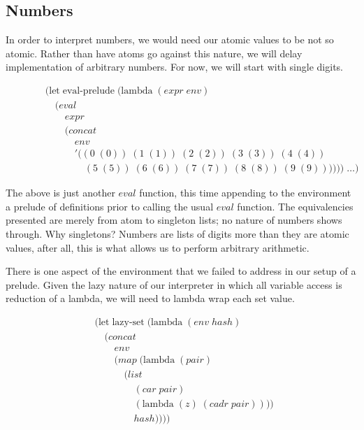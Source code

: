 \subsection{Numbers}
In order to interpret numbers, we would need our atomic values to be not so 
atomic. Rather than have atoms go against this nature, we will delay 
implementation of arbitrary numbers. For now, we will start with single 
digits.

\begin{figure}[ht]
\caption{}\label{scheme}
\begin{align*}
& (\text{let} \; \text{eval-prelude} \; (\text{lambda} \; (expr \; env)
\\& \quad (eval \; 
\\& \qquad expr
\\& \qquad (concat \; 
\\& \qquad \quad env \; 
\\& \qquad \quad '((0 \; (0)) \; (1 \; (1)) \; (2 \; (2)) \; (3 \; (3)) \; (4 \; (4)) \; 
\\& \qquad \qquad (5 \; (5)) \; (6 \; (6)) \; (7 \; (7)) \; (8 \; (8)) \; (9 \; (9)))))) \; \dots)
\end{align*}
\end{figure}

The above is just another $eval$ function, this time appending to the 
environment a prelude of definitions prior to calling the usual $eval$ 
function. The equivalencies presented are merely from atom to singleton 
lists; no nature of numbers shows through. Why singletons? Numbers are lists 
of digits more than they are atomic values, after all, this is what allows us 
to perform arbitrary arithmetic.

There is one aspect of the environment that we failed to address in our setup 
of a prelude. Given the lazy nature of our interpreter in which all variable
access is reduction of a lambda, we will need to lambda wrap each set value.

\begin{figure}[ht]
\caption{}\label{scheme}
\begin{align*}
& (\text{let} \; \text{lazy-set} \; (\text{lambda} \; (env \; hash)
\\& \quad (concat
\\& \qquad env
\\& \qquad (map \; (\text{lambda} \; (pair) \; 
\\& \qquad \quad (list \; 
\\& \qquad \qquad (car \; pair) \; 
\\& \qquad \qquad (\text{lambda} \; (z) \; (cadr \; pair)))) \; 
\\& \qquad \qquad hash))))
\end{align*}
\end{figure}

